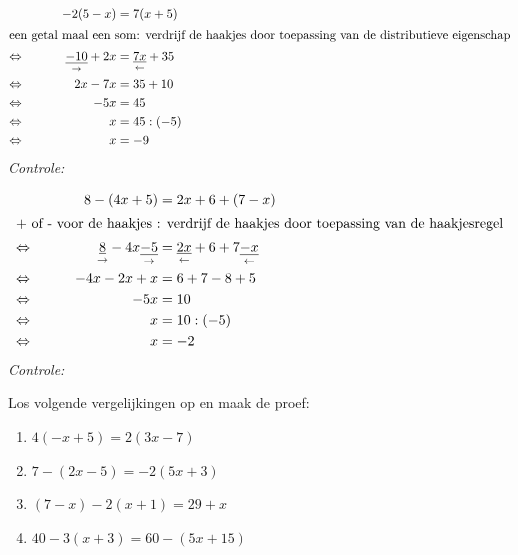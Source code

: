 \documentclass{bis}
\begin{document}
\begin{voorbeeld}
\begin{alignat*}{2}
     && - 2 (5 - x)	&= 7 (x + 5)\\
\intertext{een getal maal een som: verdrijf de haakjes door toepassing van de distributieve eigenschap}
\Leftrightarrow\mkern40mu && \underset{\rightarrow}{\underline{-10}} + 2x &= \underset{\leftarrow}{\underline{7x}} + 35 \\
\Leftrightarrow\mkern40mu && 2x - 7x	&= 35 + 10\\
\Leftrightarrow\mkern40mu && - 5x	&= 45\\
\Leftrightarrow\mkern40mu && x	&= 45 : (- 5) \\
\Leftrightarrow\mkern40mu && x &= -9
\end{alignat*}
{\em Controle: }\\
\end{voorbeeld}

\begin{voorbeeld}
\begin{alignat*}{2}
     && 8 - (4x + 5) &= 2x + 6 + (7 - x)\\
\intertext{+ of - voor de haakjes : verdrijf de haakjes door toepassing van de haakjesregel}
\Leftrightarrow\mkern40mu && \underset{\rightarrow}{\underline{8}}-4x\underset{\rightarrow}{\underline{-5}} &= \underset{\leftarrow}{\underline{2x}}+6+7\underset{\leftarrow}{\underline{-x}} \\
\Leftrightarrow\mkern40mu && 	- 4x - 2x + x	&= 6 + 7 - 8 + 5 \\
\Leftrightarrow\mkern40mu &&  - 5x	&= 10\\
\Leftrightarrow\mkern40mu &&  x	&= 10 : (- 5)\\
\Leftrightarrow\mkern40mu &&  x	&= - 2\\
\end{alignat*}
{\em Controle: }\\
\end{voorbeeld}

\begin{exercise}
Los volgende vergelijkingen op en maak de proef:
\begin{enumerate}
  \item $4 (- x + 5) = 2 (3x - 7)$
  \item $7 - (2x - 5) = - 2 (5x + 3)$
  \item $(7 - x) - 2 (x + 1) = 29 + x$
  \item $40 - 3 (x + 3) = 60 - (5x + 15)$
\end{enumerate}
\end{exercise}
\end{document}
